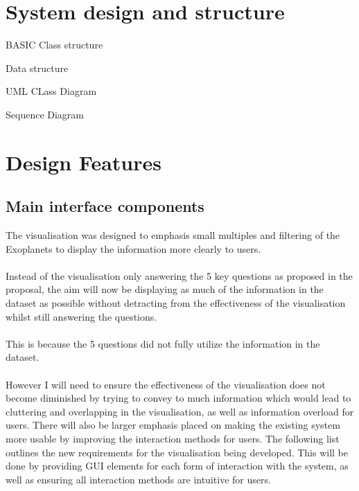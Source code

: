 




\section{System design and structure}
BASIC Class structure

Data structure

UML CLass Diagram

Sequence Diagram

\section{Design Features}
\subsection{Main interface components}
The visualisation was designed to emphasis small multiples and filtering of the Exoplanets to display the information more clearly to users. 
\\\\
Instead of the visualisation only answering the 5 key questions as proposed in the proposal, the aim will now be displaying as much of the information in the dataset as possible without detracting from the effectiveness of the visualisation whilst still answering the questions. 
\\\\
This is because the 5 questions did not fully utilize the information in the dataset. 
\\\\
However I will need to ensure the effectiveness of the visualisation does not become diminished by trying to convey to much information which would lead to cluttering and overlapping in the visualisation, as well as information overload for users. There will also be larger emphasis placed on making the existing system more usable by improving the interaction methods for users. The following list outlines the new requirements for the visualisation being developed. This will be done by providing GUI elements for each form of interaction with the system, as well as ensuring all interaction methods are intuitive for users. 
